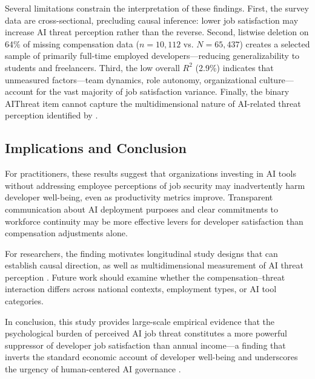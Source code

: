 \documentclass[11pt]{article}
\begin{document}
Several limitations constrain the interpretation of these findings. First, the survey
data are cross-sectional, precluding causal inference: lower job satisfaction may increase
AI threat perception rather than the reverse. Second, listwise deletion on 64\% of
missing compensation data ($n = 10{,}112$ vs. $N = 65{,}437$) creates a selected
sample of primarily full-time employed developers---reducing generalizability to students
and freelancers. Third, the low overall $R^2$ (2.9\%) indicates that unmeasured
factors---team dynamics, role autonomy, organizational culture---account for the vast
majority of job satisfaction variance. Finally, the binary AIThreat item cannot capture
the multidimensional nature of AI-related threat perception identified by \citet{reich2026}.

\subsection{Implications and Conclusion}

For practitioners, these results suggest that organizations investing in AI tools without
addressing employee perceptions of job security may inadvertently harm developer well-being,
even as productivity metrics improve. Transparent communication about AI deployment
purposes and clear commitments to workforce continuity may be more effective levers for
developer satisfaction than compensation adjustments alone.

For researchers, the finding motivates longitudinal study designs that can establish
causal direction, as well as multidimensional measurement of AI threat perception
\citep{reich2026, wolfe2025}. Future work should examine whether the compensation--threat
interaction differs across national contexts, employment types, or AI tool categories.

In conclusion, this study provides large-scale empirical evidence that the psychological
burden of perceived AI job threat constitutes a more powerful suppressor of developer job
satisfaction than annual income---a finding that inverts the standard economic account of
developer well-being and underscores the urgency of human-centered AI governance
\citep{constantinides2025, martinez2025}.
\end{document}
